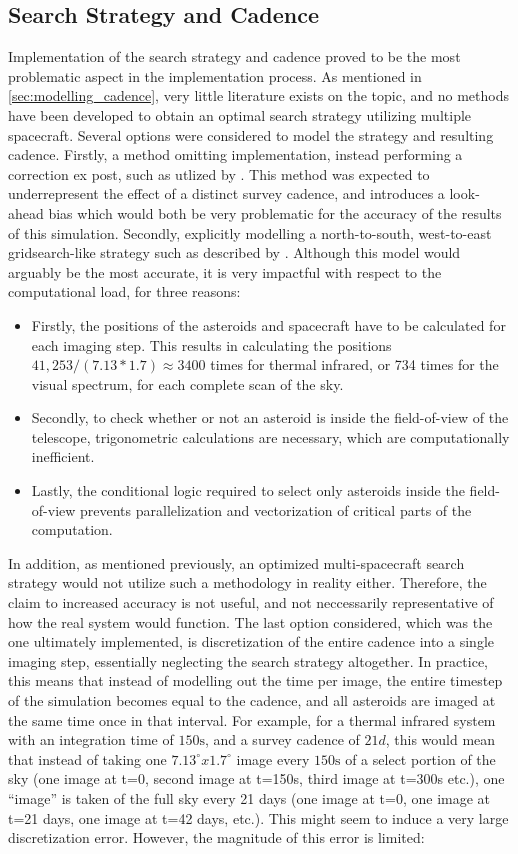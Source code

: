 \subsection{Search Strategy and Cadence}
Implementation of the search strategy and cadence proved to be the most problematic aspect in the implementation process. As mentioned in \autoref{sec:modelling_cadence}, very little literature exists on the topic, and no methods have been developed to obtain an optimal search strategy utilizing multiple spacecraft. Several options were considered to model the strategy and resulting cadence. Firstly, a method omitting implementation, instead performing a correction ex post, such as utlized by \cite{ThesisOlga}. This method was expected to underrepresent the effect of a distinct survey cadence, and introduces a look-ahead bias which would both be very problematic for the accuracy of the results of this simulation. Secondly, explicitly modelling a north-to-south, west-to-east gridsearch-like strategy such as described by \cite{NEOCam}. Although this model would arguably be the most accurate, it is very impactful with respect to the computational load, for three reasons:
\begin{itemize}
 \item Firstly, the positions of the asteroids and spacecraft have to be calculated for each imaging step. This results in calculating the positions $41,253 / (7.13*1.7) \approx 3400$ times for thermal infrared, or 734 times for the visual spectrum, for each complete scan of the sky.
 \item Secondly, to check whether or not an asteroid is inside the field-of-view of the telescope, trigonometric calculations are necessary, which are computationally inefficient.
 \item Lastly, the conditional logic required to select only asteroids inside the field-of-view prevents parallelization and vectorization of critical parts of the computation.
\end{itemize}
In addition, as mentioned previously, an optimized multi-spacecraft search strategy would not utilize such a methodology in reality either. Therefore, the claim to increased accuracy is not useful, and not neccessarily representative of how the real system would function. The last option considered, which was the one ultimately implemented, is discretization of the entire cadence into a single imaging step, essentially neglecting the search strategy altogether. In practice, this means that instead of modelling out the time per image, the entire timestep of the simulation becomes equal to the cadence, and all asteroids are imaged at the same time once in that interval. For example, for a thermal infrared system with an integration time of $150\mathrm{s}$, and a survey cadence of $21d$, this would mean that instead of taking one $7.13^\circ x1.7^\circ$ image every $150\mathrm{s}$ of a select portion of the sky (one image at t=0, second image at t=150s, third image at t=300s etc.), one ``image'' is taken of the full sky every 21 days (one image at t=0, one image at t=21 days, one image at t=42 days, etc.). This might seem to induce a very large discretization error. However, the magnitude of this error is limited:
